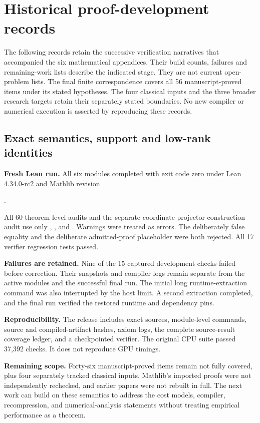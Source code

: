 \clearpage\section{Historical proof-development records}\label{sec:proof-history}


The following records retain the successive verification narratives that accompanied the six mathematical appendices. Their build counts, failures and remaining-work lists describe the indicated stage. They are not current open-problem lists. The final finite correspondence covers all 56 manuscript-proved items under its stated hypotheses. The four classical inputs and the three broader research targets retain their separately stated boundaries. No new compiler or numerical execution is asserted by reproducing these records.


\subsection{Exact semantics, support and low-rank identities}\label{sec:history-1}


\textbf{Fresh Lean run.} All six modules completed with exit code zero under Lean 4.34.0-rc2 and Mathlib revision
\begin{center}.
\end{center}
All 60 theorem-level audits and the separate coordinate-projector construction audit use only , , and . Warnings were treated as errors. The deliberately false equality and the deliberate admitted-proof placeholder were both rejected. All 17 verifier regression tests passed.

\textbf{Failures are retained.} Nine of the 15 captured development checks failed before correction. Their snapshots and compiler logs remain separate from the active modules and the successful final run. The initial long runtime-extraction command was also interrupted by the host limit. A second extraction completed, and the final run verified the restored runtime and dependency pins.

\textbf{Reproducibility.} The release includes exact sources, module-level commands, source and compiled-artifact hashes, axiom logs, the complete source-result coverage ledger, and a checkpointed verifier. The original CPU suite passed 37,392 checks. It does not reproduce GPU timings.

\textbf{Remaining scope.} Forty-six manuscript-proved items remain not fully covered, plus four separately tracked classical inputs. Mathlib's imported proofs were not independently rechecked, and earlier papers were not rebuilt in full. The next work can build on these semantics to address the cost models, compiler, recompression, and numerical-analysis statements without treating empirical performance as a theorem.


